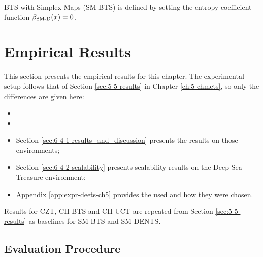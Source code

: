     BTS with Simplex Maps (SM-BTS) is defined by setting the entropy coefficient function ${\beta_{{\textnormal{SM-D}}}}(x) = 0$.












\section{Empirical Results}
\label{sec:6-4-results}

    This section presents the empirical results for this chapter. The experimental setup follows that of Section \ref{sec:5-5-results} in Chapter \ref{ch:5-chmcts}, so only the differences are given here:
    \begin{itemize}
        \item {}
        \item {}
        \item Section \ref{sec:6-4-1-results_and_discussion}
            presents the results on those environments;
        \item Section \ref{sec:6-4-2-scalability} presents
            scalability results on the Deep Sea Treasure
            environment;
        \item Appendix \ref{app:expr-deets-ch5} provides 
            the  used and how they were chosen.
    \end{itemize}

    Results for CZT, CH-BTS and CH-UCT are repeated from Section \ref{sec:5-5-results} as baselines for SM-BTS and SM-DENTS.


\subsection{Evaluation Procedure} 
\label{sec:6-4-0-eval_procedure}

